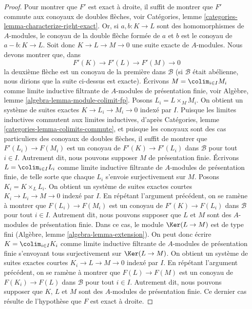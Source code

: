 \begin{proof}
\medskip\noindent
Pour montrer que $F'$ est exact à droite, il suffit de montrer que $F'$ commute
aux conoyaux de doubles flèches, voir
Catégories, lemme \ref{categories-lemma-characterize-right-exact}.
Or, si $a, b : K \to L$ sont des homomorphismes de $A$-modules, le
conoyau de la double flèche formée de $a$ et $b$ est le conoyau de $a - b : K \to L$.
Soit donc $K \to L \to M \to 0$ une suite exacte
de $A$-modules. Nous devons montrer que, dans
$$
F'(K) \to F'(L) \to F'(M) \to 0
$$
la deuxième flèche est un conoyau de la première dans $\mathcal{B}$
(si $\mathcal{B}$ était abélienne, nous dirions que la suite ci-dessus
est exacte).
Écrivons $M = \colim_{i \in I} M_i$ comme limite inductive filtrante de
$A$-modules de présentation finie, voir
Algèbre, lemme \ref{algebra-lemma-module-colimit-fp}.
Posons $L_i = L \times_M M_i$. 
On obtient un système de suites exactes $K \to L_i \to M_i \to 0$ indexé par $I$.
Puisque les limites inductives commutent aux limites inductives, d'après
Catégories, lemme \ref{categories-lemma-colimits-commute},
et puisque les conoyaux sont des cas particuliers des conoyaux de doubles flèches,
il suffit de montrer que $F'(L_i) \to F(M_i)$ est un conoyau de
$F'(K) \to F'(L_i)$ dans $\mathcal{B}$ pour tout $i \in I$. Autrement dit, nous pouvons
supposer $M$ de présentation finie. Écrivons $L = \colim_{i \in I} L_i$
comme limite inductive filtrante de $A$-modules de présentation finie,
de telle sorte que chaque $L_i$ s'envoie surjectivement sur $M$.
Posons $K_i = K \times_L L_i$. On obtient un système de suites exactes courtes
$K_i \to L_i \to M \to 0$ indexé par $I$.
En répétant l'argument précédent, on se ramène à montrer que
$F(L_i) \to F(M_i)$ est un conoyau de
$F'(K) \to F(L_i)$ dans $\mathcal{B}$ pour tout $i \in I$.
Autrement dit, nous pouvons supposer que
$L$ et $M$ sont des $A$-modules de présentation finie.
Dans ce cas, le module $\Ker(L \to M)$ est de type fini
(Algèbre, lemme \ref{algebra-lemma-extension}).
On peut donc écrire $K = \colim_{i \in I} K_i$ comme limite inductive filtrante
de $A$-modules de présentation finie s'envoyant tous surjectivement sur $\Ker(L \to M)$.
On obtient un système de suites exactes courtes
$K_i \to L \to M \to 0$ indexé par $I$.
En répétant l'argument précédent, on se ramène à montrer que
$F(L) \to F(M)$ est un conoyau de
$F(K_i) \to F(L)$ dans $\mathcal{B}$ pour tout $i \in I$.
Autrement dit, nous pouvons supposer que $K$, $L$ et $M$
sont des $A$-modules de présentation finie. Ce dernier cas résulte
de l'hypothèse que $F$ est exact à droite.
\end{proof}

